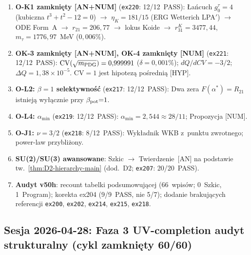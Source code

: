 \begin{remark}
\label{rem:session-v50}
\begin{enumerate}[nosep]
  \item \textbf{O-K1 zamkni\k{e}ty [AN+NUM]} (\texttt{ex220}: 12/12~PASS):
    \L{}a\'ncuch $g_0^\tau{=}4$ (kubiczna $t^3{+}t^2{-}12{=}0$)
    $\to$ $\eta_K{=}181/15$ (ERG Wetterich LPA$'$)
    $\to$ ODE Form~A $\to$ $r_{21}{=}206{,}77$
    $\to$ lokus Koide $\to$ $r_{31}^K{=}3477{,}44$,
    $m_\tau{=}1776{,}97$~MeV ($0{,}006\%$).

  \item \textbf{OK-3 zamkni\k{e}ty [AN+NUM], OK-4 zamkni\k{e}ty [NUM]}
    (\texttt{ex221}: 12/12~PASS):
    $\mathrm{CV}(\sqrt{m_{\rm PDG}}) = 0{,}999991$ ($\delta = 0{,}001\%$);
    $dQ/dCV = -3/2$; $\Delta Q = 1{,}38 \times 10^{-5}$.
    CV${=}1$ jest hipotez\k{a} po\'sredni\k{a} [HYP].

  \item \textbf{O-L2: $\beta{=}1$ selektywno\'s\'c} (\texttt{ex217}: 12/12~PASS):
    Dwa zera $F(\alpha^*){=}R_{21}$ istniej\k{a}
    wy\l{}\k{a}cznie przy $\beta_{\rm pot}{=}1$.

  \item \textbf{O-L4: $\alpha_{\min}$} (\texttt{ex219}: 12/12~PASS):
    $\alpha_{\min} = 2{,}544 \approx 28/11$;
    Propozycja [NUM].

  \item \textbf{O-J1: $\nu = 3/2$} (\texttt{ex218}: 8/12~PASS):
    Wyk\l{}adnik WKB z~punktu zwrotnego; power-law przybli\.zony.

  \item \textbf{SU(2)/SU(3) awansowane}:
    Szkic $\to$ Twierdzenie~[AN] na podstawie
    tw.~\ref{thm:D2-hierarchy-main} (dod.~D2;
    \texttt{ex207}: 20/20~PASS).

  \item \textbf{Audyt v50h}: recount tabelki podsumowuj\k{a}cej
    (66~wpis\'ow; 0~Szkic, 1~Program);
    korekta ex204 (9/9~PASS, nie 5/7);
    dodanie brakuj\k{a}cych referencji
    \texttt{ex200}, \texttt{ex202}, \texttt{ex214},
    \texttt{ex215}, \texttt{ex218}.
\end{enumerate}
\end{remark}

\subsection*{Sesja 2026-04-28: Faza 3 UV-completion audyt strukturalny (cykl zamkni\k{e}ty 60/60)}
\label{ssec:phase3-closure}

